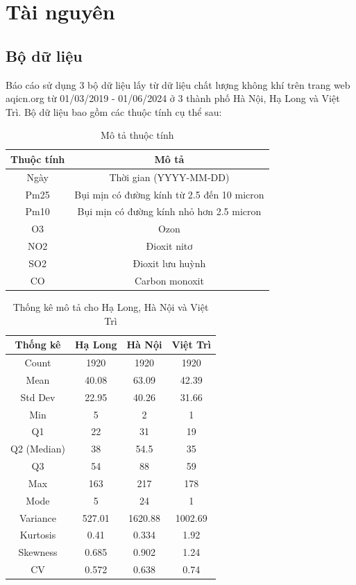 \section{Tài nguyên}

\subsection{Bộ dữ liệu}
Báo cáo sử dụng 3 bộ dữ liệu lấy từ dữ liệu chất lượng không khí trên trang web aqicn.org từ 01/03/2019 - 01/06/2024 ở 3 thành phố Hà Nội, Hạ Long và Việt Trì. Bộ dữ liệu bao gồm các thuộc tính cụ thể sau:
\begin{table}[h]
  \centering
  \caption{Mô tả thuộc tính}
  \begin{tabular}{|c|c|}
    \hline
    \textbf{Thuộc tính} & \textbf{Mô tả} \\ \hline
    Ngày & Thời gian (YYYY-MM-DD) \\ \hline
    Pm25 & Bụi mịn có đường kính từ 2.5 đến 10 micron \\ \hline
    Pm10 & Bụi mịn có đường kính nhỏ hơn 2.5 micron \\ \hline
    O3 & Ozon \\ \hline
    NO2 & Đioxit nitơ \\ \hline
    SO2 & Đioxit lưu huỳnh \\ \hline
    CO & Carbon monoxit \\ \hline
  \end{tabular}
\end{table}

\begin{table}[h!]
\centering
\caption{Thống kê mô tả cho Hạ Long, Hà Nội và Việt Trì}
\label{tab:stats}
\begin{tabular}{|c|c|c|c|}
\hline
\textbf{Thống kê} & \textbf{Hạ Long} & \textbf{Hà Nội} & \textbf{Việt Trì} \\
\hline
Count & 1920 & 1920 & 1920 \\
Mean & 40.08 & 63.09 & 42.39 \\
Std Dev & 22.95 & 40.26 & 31.66 \\
Min & 5 & 2 & 1 \\
Q1 & 22 & 31 & 19 \\
Q2 (Median) & 38 & 54.5 & 35 \\
Q3 & 54 & 88 & 59 \\
Max & 163 & 217 & 178 \\
Mode & 5 & 24 & 1 \\
Variance & 527.01 & 1620.88 & 1002.69 \\
Kurtosis & 0.41 & 0.334 & 1.92 \\
Skewness & 0.685 & 0.902 & 1.24 \\
CV & 0.572 & 0.638 & 0.74 \\
\hline
\end{tabular}
\end{table}


